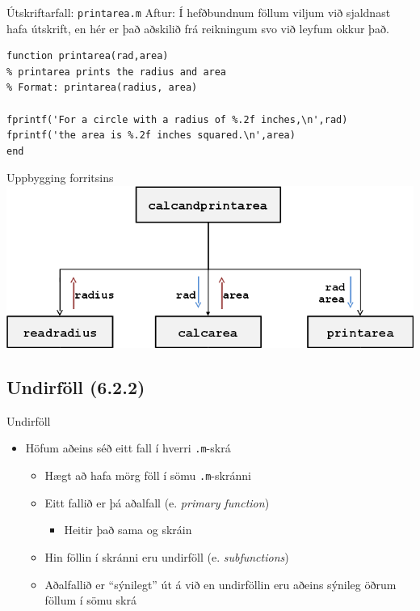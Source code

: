 \documentclass{beamer}
\begin{document}
\begin{frame}[fragile]{Útskriftarfall: \texttt{printarea.m}}
\vspace{\baselineskip}
Aftur: Í hefðbundnum föllum viljum við sjaldnast hafa útskrift, en hér er það aðskilið frá reikningum svo við leyfum okkur það.

\begin{verbatim}
function printarea(rad,area)
% printarea prints the radius and area
% Format: printarea(radius, area)

fprintf('For a circle with a radius of %.2f inches,\n',rad)
fprintf('the area is %.2f inches squared.\n',area)
end
\end{verbatim}
\end{frame}

\begin{frame}{Uppbygging forritsins}
\includegraphics[width=\textwidth]{Pics/organization-example}
\end{frame}

\subsection{Undirföll (6.2.2)}

\begin{frame}{Undirföll}
\begin{itemize}
 \item Höfum aðeins séð eitt fall í hverri \texttt{.m}-skrá
 \begin{itemize}
  \item Hægt að hafa mörg föll í sömu \texttt{.m}-skránni
  \item Eitt fallið er þá aðalfall (e. \emph{primary function})
  \begin{itemize}
   \item Heitir það sama og skráin
  \end{itemize}
  \item Hin föllin í skránni eru undirföll (e. \emph{subfunctions})
  \item Aðalfallið er ``sýnilegt'' út á við en undirföllin eru aðeins sýnileg öðrum föllum í sömu skrá
 \end{itemize}
\end{itemize}
\end{frame}
\end{document}
